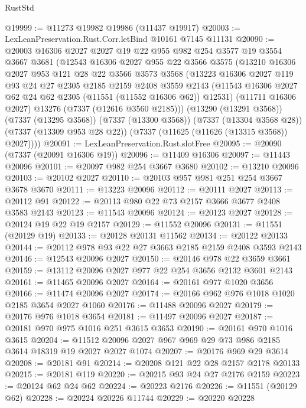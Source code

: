 \begin{lexlean}{RustStd}
\begin{coremodule}
@19999 := @11273 @19982 @19986 (@11437 @19917)
@20003 := LexLeanPreservation.Rust.Corr.letBind @10161 @7145 @11131
@20090 := @20003
    @16306
    @2027
    @2027
    @19
    @22
    @955
    @982
    @254
    @3577
    @19
    @3554
    @3667
    @3681
    (@12543
      @16306
      @2027
      @955
      @22
      @3566
      @3575
      (@13210
        @16306
        @2027
        @953
        @121
        @28
        @22
        @3566
        @3573
        @3568
        (@13223
          @16306
          @2027
          @119
          @93
          @24
          @27
          @2305
          @2185
          @2159
          @2408
          @3559
          @2143
          (@11543 @16306 @2027 @62 @24 @62 @2305 (@11551 (@11552 @16306 @62)) @12531)
          (@11711 @16306 @2027)
          @13276
          (@7337 (@12616 @3560 @2185)))
        (@13290 (@13291 @3568))
        (@7337 (@13295 @3568))
        (@7337 (@13300 @3568))
        (@7337 (@13304 @3568 @28))
        (@7337 (@13309 @953 @28 @22))
        (@7337 (@11625 (@11626 (@13315 @3568)) @2027))))
@20091 := LexLeanPreservation.Rust.slotFree
@20095 := @20090 (@7337 (@20091 @16306 @19))
@20096 := @11409 @16306
@20097 := @11443 @20096
@20101 := @20097 @982 @254 @3667 @3680
@20102 := @13210 @20096
@20103 := @20102 @2027
@20110 := @20103 @957 @981 @251 @254 @3667 @3678 @3670
@20111 := @13223 @20096
@20112 := @20111 @2027
@20113 := @20112 @91
@20122 := @20113 @980 @22 @73 @2157 @3666 @3677 @2408 @3583 @2143
@20123 := @11543 @20096
@20124 := @20123 @2027
@20128 := @20124 @19 @22 @19 @2157
@20129 := @11552 @20096
@20131 := @11551 (@20129 @19)
@20133 := @20128 @20131 @11562
@20134 := @20122 @20133
@20144 := @20112 @978 @93 @22 @27 @3663 @2185 @2159 @2408 @3593 @2143
@20146 := @12543 @20096 @2027
@20150 := @20146 @978 @22 @3659 @3661
@20159 := @13112 @20096 @2027 @977 @22 @254 @3656 @2132 @3601 @2143
@20161 := @11465 @20096 @2027
@20164 := @20161 @977 @1020 @3656
@20166 := @11474 @20096 @2027
@20174 := @20166 @962 @976 @1018 @1020 @2185 @3654 @2027 @1060
@20176 := @11488 @20096 @2027
@20179 := @20176 @976 @1018 @3654
@20181 := @11497 @20096 @2027
@20187 := @20181 @970 @975 @1016 @251 @3615 @3653
@20190 := @20161 @970 @1016 @3615
@20204 := @11512 @20096 @2027 @967 @969 @29 @73 @986 @2185 @3614 @18319 @19 @2027 @2027 @1074
@20207 := @20176 @969 @29 @3614
@20208 := @20181 @91
@20214 := @20208 @121 @22 @28 @2157 @2178 @20133
@20215 := @20181 @119
@20220 := @20215 @93 @24 @27 @2176 @2159
@20223 := @20124 @62 @24 @62
@20224 := @20223 @2176
@20226 := @11551 (@20129 @62)
@20228 := @20224 @20226 @11744
@20229 := @20220 @20228

\end{coremodule}
\end{lexlean}
